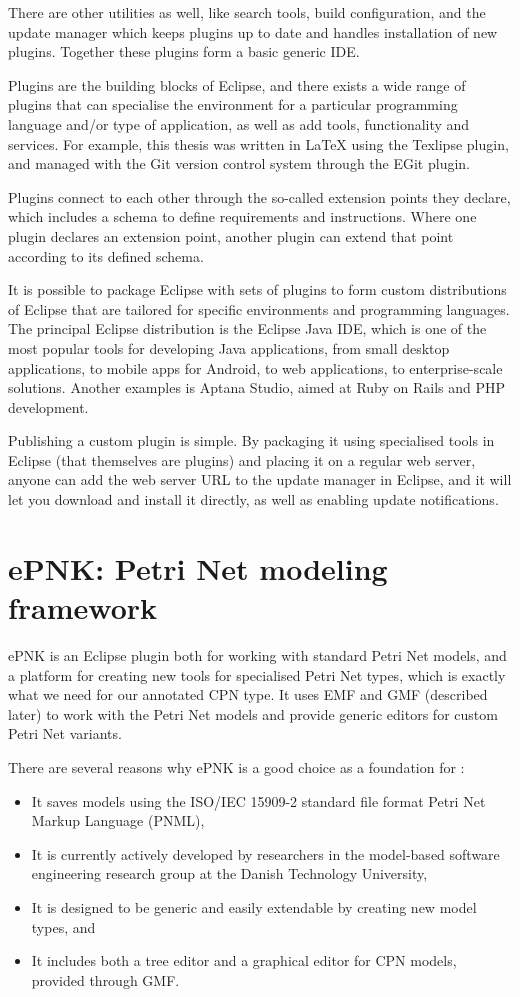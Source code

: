 There are other utilities as well, like search tools, build configuration, and
the update manager which keeps plugins up to date and handles installation of
new plugins. Together these plugins form a basic generic IDE.

Plugins are the building blocks
of Eclipse, and there exists a wide range of plugins that can specialise the
environment for a particular programming language and/or type of application,
as well as add tools, functionality and services. For example, this thesis was
written in \LaTeX{} using the Texlipse plugin, and managed with the Git version
control system through the EGit plugin.

Plugins connect to each other through the so-called extension points they
declare, which includes a schema to define requirements and instructions.
Where one plugin declares an extension point, another plugin can extend that
point according to its defined schema.

It is possible to package Eclipse with sets of plugins to form custom
distributions of Eclipse that are tailored for specific environments and
programming languages. The principal Eclipse distribution is the Eclipse Java
IDE, which is one of the most popular tools for developing Java applications,
from small desktop applications, to mobile apps for Android, to web
applications, to enterprise-scale solutions. Another examples is Aptana Studio,
aimed at Ruby on Rails and PHP development. 

Publishing a custom plugin is simple. By packaging it using specialised tools
in Eclipse (that themselves are plugins) and placing it on a regular web
server, anyone can add the web server URL to the update manager in Eclipse, and
it will let you download and install it directly, as well as enabling update
notifications.


\section{ePNK: Petri Net modeling framework}
\label{sec:epnk}
ePNK is an Eclipse plugin both for working with standard Petri Net models, and a
platform for creating new tools for specialised Petri Net types, which is
exactly what we need for our annotated CPN type. It uses EMF and GMF
(described later) to work with the Petri Net models and provide generic
editors for custom Petri Net variants.

There are several reasons why ePNK is a good choice as a foundation for \thename{}:
\begin{itemize}
	\item It saves models using the ISO/IEC 15909-2 \cite{ISO-15909-2} standard
	file format Petri Net Markup Language (PNML),
	\item It is currently actively developed by researchers in the model-based
	software engineering research group at the Danish Technology University,
	\item It is designed to be generic and easily extendable by creating new model
	types, and
	\item It includes both a tree editor and a graphical editor for CPN models,
	provided through GMF.
\end{itemize}

